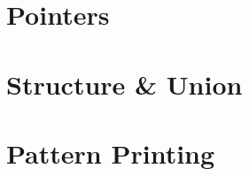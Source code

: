 \documentclass{book}
\begin{document}
\chapter{Pointers}
\chapter{Structure \& Union}
\chapter{Pattern Printing}
\end{document}
